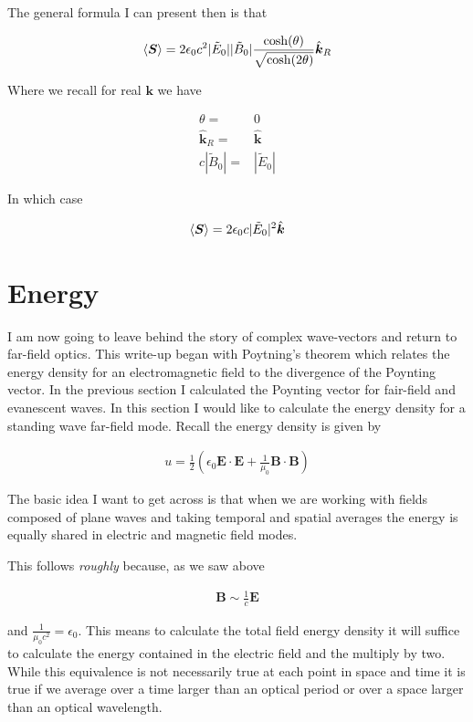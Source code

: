 \documentclass[12pt]{article}
\newcommand{\ep}{\epsilon}
\renewcommand{\vec}[1]{\boldsymbol{#1}}
\newcommand{\unitvec}[1]{\hat{\boldsymbol{#1}}}
\begin{document}
The general formula I can present then is that

\begin{align}
\Braket{\vec{S}} = 2\ep_0 c^2|\tilde{E}_0||\tilde{B}_0| \frac{\cosh(\theta)}{\sqrt{\cosh(2\theta)}} \unitvec{k}_R
\end{align}

Where we recall for real $\vec{k}$ we have

\begin{align}
\theta =&0\\
\unitvec{k}_R =& \unitvec{k}\\
c|\tilde{B}_0| =& |\tilde{E}_0|
\end{align}

In which case

\begin{align}
\Braket{\vec{S}} = 2\ep_0c|\tilde{E}_0|^2\unitvec{k}
\end{align}

\section{Energy}

I am now going to leave behind the story of complex wave-vectors and return to far-field optics.
This write-up began with Poytning's theorem which relates the energy density for an electromagnetic field to the divergence of the Poynting vector.
In the previous section I calculated the Poynting vector for fair-field and evanescent waves.
In this section I would like to calculate the energy density for a standing wave far-field mode.
Recall the energy density is given by

\begin{align}
u = \frac{1}{2}\left(\ep_0 \vec{E}\cdot\vec{E} + \frac{1}{\mu_0}\vec{B}\cdot\vec{B}\right)
\end{align}

The basic idea I want to get across is that when we are working with fields composed of plane waves and taking temporal and spatial averages the energy is equally shared in electric and magnetic field modes.

This follows \textit{roughly} because, as we saw above

\begin{align}
\vec{B} \sim \frac{1}{c}\vec{E}
\end{align}

and $\frac{1}{\mu_0 c^2} = \ep_0$.
This means to calculate the total field energy density it will suffice to calculate the energy contained in the electric field and the multiply by two.
While this equivalence is not necessarily true at each point in space and time it is true if we average over a time larger than an optical period or over a space larger than an optical wavelength.
\end{document}
